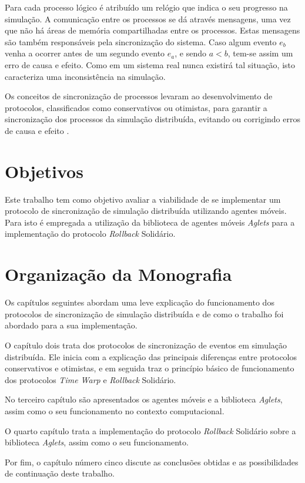 Para cada processo lógico é atribuído um relógio que indica o seu progresso na simulação. A comunicação entre os processos se dá através mensagens, uma vez que não há áreas de memória compartilhadas entre os processos. Estas mensagens são também responsáveis pela sincronização do sistema. Caso algum evento $e_b$ venha a ocorrer antes de um segundo evento $e_a$, e sendo $a < b$, tem-se assim um erro de causa e efeito. Como em um sistema real nunca existirá tal situação, isto caracteriza uma inconsistência na simulação.

Os conceitos de sincronização de processos levaram ao desenvolvimento de protocolos, classificados como conservativos ou otimistas, para garantir a sincronização dos processos da simulação distribuída, evitando ou corrigindo erros de causa e efeito \cite{FUJIMOTO}.

\section{Objetivos}
Este trabalho tem como objetivo avaliar a viabilidade de se implementar um protocolo de sincronização de simulação distribuída utilizando agentes móveis. Para isto é empregada a utilização da biblioteca de agentes móveis \textit{Aglets} para a implementação do protocolo \textit{Rollback} Solidário.

\section{Organização da Monografia}
Os capítulos seguintes abordam uma leve explicação do funcionamento dos protocolos de sincronização de simulação distribuída e de como o trabalho foi abordado para a sua implementação.

O capítulo dois trata dos protocolos de sincronização de eventos em simulação distribuída. Ele inicia com a explicação das principais diferenças entre protocolos conservativos e otimistas, e em seguida traz o princípio básico de funcionamento dos protocolos \textit{Time Warp} e \textit{Rollback} Solidário.

No terceiro capítulo são apresentados os agentes móveis e a biblioteca \textit{Aglets}, assim como o seu funcionamento no contexto computacional.

O quarto capítulo trata a implementação do protocolo \textit{Rollback} Solidário sobre a biblioteca \textit{Aglets}, assim como o seu funcionamento.

Por fim, o capítulo número cinco discute as conclusões obtidas e as possibilidades de continuação deste trabalho.